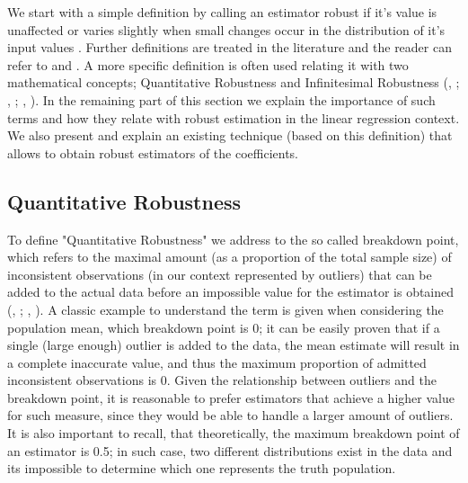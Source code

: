 \documentclass[a4paper]{article}
\begin{document}
We start with a simple definition by calling an estimator robust if it's value is unaffected or varies slightly when small changes occur in the distribution of it's input values \citep{wilcox2016}. Further definitions are treated in the literature and the reader can refer to \citet{huber1981} and \citet{wilcox2016}. A more specific definition is often used relating it with two mathematical concepts; Quantitative Robustness and Infinitesimal Robustness (\citeauthor{huber1981}, \citeyear{huber1981}; \citeauthor{ruckstuhl2016}, \citeyear{ruckstuhl2016}; \citeauthor{wilcox2016}, \citeyear{wilcox2016}). In the remaining part of this section we explain the importance of such terms and how they relate with robust estimation in the linear regression context. We also present and explain an existing technique (based on this definition) that allows to obtain robust estimators of the coefficients.

\subsection{Quantitative Robustness}
To define "Quantitative Robustness" we address to the so called breakdown point, which refers to the maximal amount (as a proportion of the total sample size) of inconsistent observations (in our context represented by outliers) that can be added to the actual data before an impossible value for the estimator is obtained (\citeauthor{ruckstuhl2016}, \citeyear{ruckstuhl2016}; \citeauthor{wilcox2016}, \citeyear{wilcox2016}). A classic example to understand the term is given when considering the population mean, which breakdown point is 0; it can be easily proven that if a single (large enough) outlier is added to the data, the mean estimate will result in a complete inaccurate value, and thus the maximum proportion of admitted inconsistent observations is 0. Given the relationship between outliers and the breakdown point, it is reasonable to prefer estimators that achieve a higher value for such measure, since they would be able to handle a larger amount of outliers. It is also important to recall, that theoretically, the maximum breakdown point of an estimator is 0.5; in such case, two different distributions exist in the data and its impossible to determine which one represents the truth population.
\end{document}
